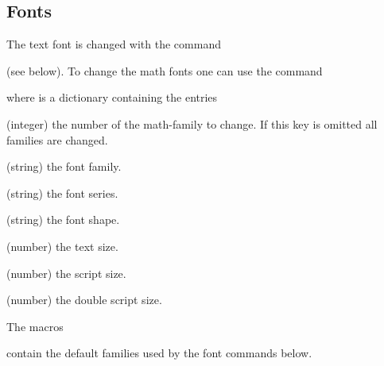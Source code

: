 \subsection{Fonts}   %


The text font is changed with the command
\begin{code}
   
\end{code}
(see below). To change the math fonts one can use the command
\begin{code}
  \cs{\setmathfont} 
\end{code}
where  is a dictionary containing the entries
\begin{longdescription}
\item{\quad (integer)}
  the number of the math-family to change.
  If this key is omitted all families are changed.
\item{\quad (string)}
  the font family.
\item{\quad (string)}
  the font series.
\item{\quad (string)}
  the font shape.
\item{\quad (number)}
  the text size.
\item{\quad (number)}
  the script size.
\item{\quad (number)}
  the double script size.
\end{longdescription}

The macros
\begin{code}
  \cs{\FontFamilyRoman}

  \cs{\FontFamilySans}

  \cs{\FontFamilyTypewriter}

  \cs{\FontFamilyMath}

  \cs{\FontFamilyExtensions}

  \cs{\FontFamilySymbols}
\end{code}
contain the default families used by the font commands below.

